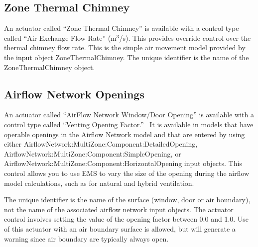 \subsection{Zone Thermal Chimney}\label{zone-thermal-chimney}

An actuator called ``Zone Thermal Chimney'' is available with a control type called ``Air Exchange Flow Rate'' (m\(^{3}\)/s). This provides override control over the thermal chimney flow rate. This is the simple air movement model provided by the input object ZoneThermalChimney. The unique identifier is the name of the ZoneThermalChimney object.

\subsection{Airflow Network Openings}\label{airflow-network-openings}

An actuator called ``AirFlow Network Window/Door Opening'' is available with a control type called ``Venting Opening Factor.''~ It is available in models that have operable openings in the Airflow Network model and that are entered by using either AirflowNetwork:MultiZone:Component:DetailedOpening, AirflowNetwork:MultiZone:Component:SimpleOpening, or AirflowNetwork:MultiZone:Component:HorizontalOpening input objects. This control allows you to use EMS to vary the size of the opening during the airflow model calculations, such as for natural and hybrid ventilation.

The unique identifier is the name of the surface (window, door or air boundary), not the name of the associated airflow network input objects. The actuator control involves setting the value of the opening factor between 0.0 and 1.0. Use of this actuator with an air boundary surface is allowed, but will generate a warning since air boundary are typically always open.
